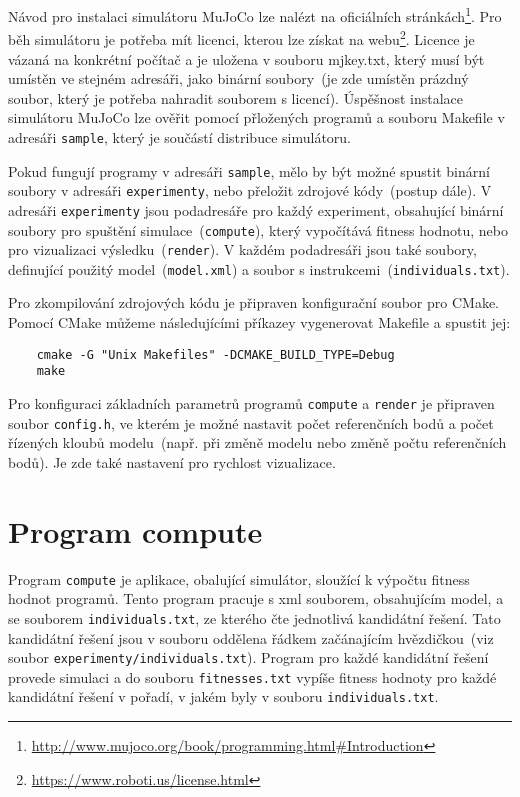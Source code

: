 Návod pro instalaci simulátoru MuJoCo lze nalézt na oficiálních stránkách\footnote{\url{http://www.mujoco.org/book/programming.html\#Introduction}}.
Pro běh simulátoru je potřeba mít licenci, kterou lze získat na webu\footnote{\url{https://www.roboti.us/license.html}}.
Licence je vázaná na konkrétní počítač a je uložena v souboru mjkey.txt, který musí být umístěn ve stejném adresáři, jako binární soubory~(je zde umístěn prázdný soubor, který je potřeba nahradit souborem s licencí).
Úspěšnost instalace simulátoru MuJoCo lze ověřit pomocí přložených programů a souboru Makefile v adresáři \texttt{sample}, který je součástí distribuce simulátoru.

Pokud fungují programy v adresáři \texttt{sample}, mělo by být možné spustit binární soubory v adresáři \texttt{experimenty}, nebo přeložit zdrojové kódy~(postup dále).
V adresáři \texttt{experimenty} jsou podadresáře pro každý experiment, obsahující binární soubory pro spuštění simulace~(\texttt{compute}), který vypočítává fitness hodnotu, nebo pro vizualizaci výsledku~(\texttt{render}).
V každém podadresáři jsou také soubory, definující použitý model~(\texttt{model.xml}) a soubor s instrukcemi~(\texttt{individuals.txt}).

Pro zkompilování zdrojových kódu je připraven konfigurační soubor pro CMake.
Pomocí CMake můžeme následujícími příkazey vygenerovat Makefile a spustit jej:
\begin{verbatim}
    cmake -G "Unix Makefiles" -DCMAKE_BUILD_TYPE=Debug
    make
\end{verbatim}

Pro konfiguraci základních parametrů programů \texttt{compute} a \texttt{render} je připraven soubor \texttt{config.h}, ve kterém je možné nastavit počet referenčních bodů a počet řízených kloubů modelu~(např. při změně modelu nebo změně počtu referenčních bodů).
Je zde také nastavení pro rychlost vizualizace.


\section{Program compute}
Program \texttt{compute} je aplikace, obalující simulátor, sloužící k výpočtu fitness hodnot programů.
Tento program pracuje s xml souborem, obsahujícím model, a se souborem \texttt{individuals.txt}, ze kterého čte jednotlivá kandidátní řešení.
Tato kandidátní řešení jsou v souboru oddělena řádkem začánajícím hvězdičkou~(viz soubor \texttt{experimenty/individuals.txt}).
Program pro každé kandidátní řešení provede simulaci a do souboru \texttt{fitnesses.txt} vypíše fitness hodnoty pro každé kandidátní řešení v pořadí, v jakém byly v souboru \texttt{individuals.txt}.

